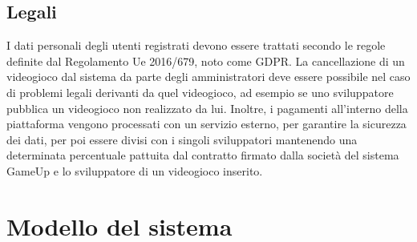 \subsection{Legali}
I dati personali degli utenti registrati devono essere trattati secondo le regole definite dal Regolamento Ue 2016/679, noto come GDPR. La cancellazione di un videogioco dal sistema da parte degli amministratori deve essere possibile nel caso di problemi legali derivanti da quel videogioco, ad esempio se uno sviluppatore pubblica un videogioco non realizzato da lui. Inoltre, i pagamenti all’interno della piattaforma vengono processati con un servizio esterno, per garantire la sicurezza dei dati, per poi essere divisi con i singoli sviluppatori mantenendo una determinata percentuale pattuita dal contratto firmato dalla società del sistema GameUp e lo sviluppatore di un videogioco inserito. 

\section{Modello del sistema}
